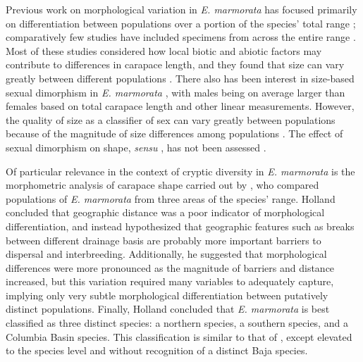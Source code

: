 \documentclass[11pt]{article}
\begin{document}
Previous work on morphological variation in \textit{E. marmorata} has focused primarily on differentiation between populations over a portion of the species' total range \citep{Lubcke2007,Germano2008,Germano2009,Bury2010}; comparatively few studies have included specimens from across the entire range \citep{Holland1992}. Most of these studies considered how local biotic and abiotic factors may contribute to differences in carapace length, and they found that size can vary greatly between different populations \citep{Lubcke2007,Germano2008,Germano2009}. There also has been interest in size-based sexual dimorphism in \textit{E. marmorata} \citep{Holland1992,Lubcke2007,Germano2009}, with males being on average larger than females based on total carapace length and other linear measurements. However, the quality of size as a classifier of sex can vary greatly between populations \citep{Holland1992} because of the magnitude of size differences among populations \citep{Lubcke2007,Germano2009}. The effect of sexual dimorphism on shape, \textit{sensu} \citet{Kendall1977a}, has not been assessed \citep{Holland1992,Lubcke2007,Germano2008}.

Of particular relevance in the context of cryptic diversity in \textit{E. marmorata} is the morphometric analysis of carapace shape carried out by \citet{Holland1992}, who compared populations of \textit{E. marmorata} from three areas of the species' range. Holland concluded that geographic distance was a poor indicator of morphological differentiation, and instead hypothesized that geographic features such as breaks between different drainage basis are probably more important barriers to dispersal and interbreeding. Additionally, he suggested that morphological differences were more pronounced as the magnitude of barriers and distance increased, but this variation required many variables to adequately capture, implying only very subtle morphological differentiation between putatively distinct populations. Finally, Holland concluded that \textit{E. marmorata} is best classified as three distinct species: a northern species, a southern species, and a Columbia Basin species. This classification is similar to that of \citet{Seeliger1945}, except elevated to the species level and without recognition of a distinct Baja species. 
\end{document}

